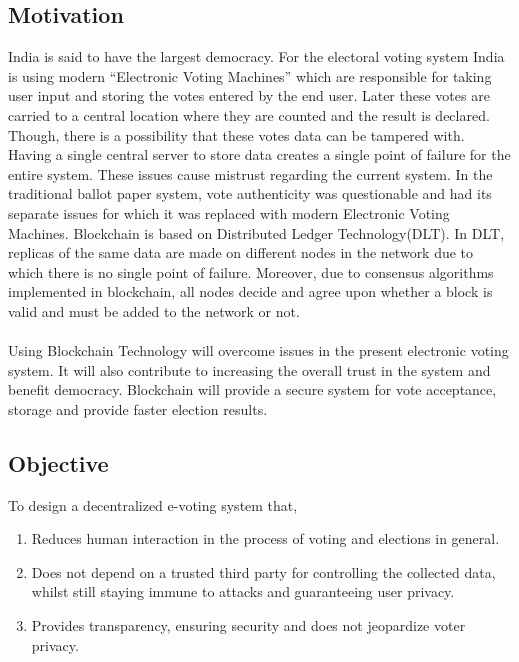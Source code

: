 \documentclass[oneside, 12pt]{book}
\begin{document}
		\subsection{Motivation}
			India is said to have the largest democracy. For the electoral voting system India is using modern “Electronic Voting Machines” which are responsible for taking user input and storing the votes entered by the end user. Later these votes are carried to a central location where they are counted and the result is declared. Though, there is a possibility that these votes data can be tampered with. Having a single central server to store data creates a single point of failure for the entire system. These issues cause mistrust regarding the current system. In the traditional ballot paper system, vote authenticity was questionable and had its separate issues for which it was replaced with modern Electronic Voting Machines. Blockchain is based on Distributed Ledger Technology(DLT). In DLT, replicas of the same data are made on different nodes in the network due to which there is no single point of failure. Moreover, due to consensus algorithms implemented in blockchain, all nodes decide and agree upon whether a block is valid and must be added to the network or not.
			\\\\Using Blockchain Technology will overcome issues in the present electronic voting system. It will also contribute to increasing the overall trust in the system and benefit democracy. Blockchain will provide a secure system for vote acceptance, storage and provide faster election results.
		\subsection{Objective}
			To design a decentralized e-voting system that,
			\begin{enumerate}
				\item Reduces human interaction in the process of voting and elections in general. 
				\item Does not depend on a trusted third party for controlling the collected data, whilst still staying immune to attacks and guaranteeing user privacy.
				\item Provides transparency, ensuring security and does not jeopardize voter privacy.
			\end{enumerate}
\end{document}
